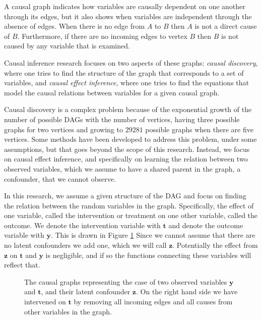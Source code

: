 \documentclass{report}
\newcommand{\bt}{\mathbf{t}}
\newcommand{\by}{\mathbf{y}}
\newcommand{\bz}{\mathbf{z}}
\begin{document}
A causal graph indicates how variables are causally dependent on one another through its edges, but it also shows when variables are independent through the absence of edges. When there is no edge from $A$ to $B$ then $A$ is not a direct cause of $B$. Furthermore, if there are no incoming edges to vertex $B$ then $B$ is not caused by any variable that is examined.

Causal inference research focuses on two aspects of these graphs: \textit{causal discovery}, where one tries to find the structure of the graph that corresponds to a set of variables, and \textit{causal effect inference}, where one tries to find the equations that model the causal relations between variables for a given causal graph.

Causal discovery is a complex problem because of the exponential growth of the number of possible DAGs with the number of vertices,
having three possible graphs for two vertices and growing to $29281$ possible graphs when there are five vertices\parencite{robinson1977counting}. Some methods have been developed to address this problem, under some assumptions, but that goes beyond the scope of this research. Instead, we focus on causal effect inference, and specifically on learning the relation between two observed variables, which we assume to have a shared parent in the graph, a confounder, that we cannot observe.

In this research, we assume a given structure of the DAG and focus on finding the relation between the random variables in the graph. Specifically, the effect of one variable, called the intervention or treatment on one other variable, called the outcome. We denote the intervention variable with $\bt$ and denote the outcome variable with $\by$. This is drawn in Figure \ref{fig:graph_confounder_and_intervention} Since we cannot assume that there are no latent confounders we add one, which we will call $\bz$. Potentially the effect from $\bz$ on $\bt$ and $\by$ is negligible, and if so the functions connecting these variables will reflect that.


\begin{figure}
    \centering
    
    \hspace{2cm}
    
    \caption{The causal graphs representing the case of two observed variables $\by$ and $\bt$, and their latent confounder $\bz$. On the right hand side we have intervened on $\bt$ by removing all incoming edges and all causes from other variables in the graph.}
    \label{fig:graph_confounder_and_intervention}
\end{figure}
\end{document}

